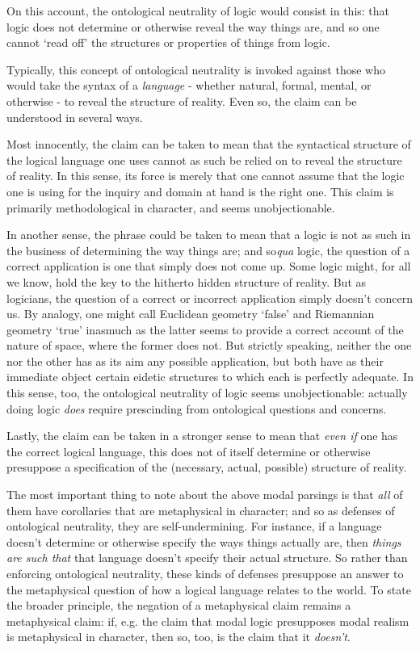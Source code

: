 \documentclass[]{article}
\begin{document}
On this account, the ontological neutrality of logic would consist in this: that logic does not determine or otherwise reveal the way things are, and so one cannot `read off' the structures or properties of things from logic.

Typically, this concept of ontological neutrality is invoked against those who would take the syntax of a \textit{language} - whether natural, formal, mental, or otherwise - to reveal the structure of reality. Even so, the claim can be understood in several ways. 

Most innocently, the claim can be taken to mean that the syntactical structure of the logical language one uses cannot as such be relied on to reveal the structure of reality. In this sense, its force is merely that one cannot assume that the logic one is using for the inquiry and domain at hand is the right one. This claim is primarily methodological in character, and seems unobjectionable.

In another sense, the phrase could be taken to mean that a logic is not as such in the business of determining the way things are; and so\textit{qua} logic, the question of a correct application is one that simply does not come up. Some logic might, for all we know, hold the key to the hitherto hidden structure of reality. But as logicians, the question of a correct or incorrect application simply doesn't concern us. By analogy, one might call Euclidean geometry `false' and Riemannian geometry `true' inasmuch as the latter seems to provide a correct account of the nature of space, where the former does not. But strictly speaking, neither the one nor the other has as its aim any possible application, but both have as their immediate object certain eidetic structures to which each is perfectly adequate. In this sense, too, the ontological neutrality of logic seems unobjectionable: actually doing logic \textit{does} require prescinding from ontological questions and concerns.

Lastly, the claim can be taken in a stronger sense to mean that \textit{even if} one has the correct logical language, this does not of itself determine or otherwise presuppose a specification of the (necessary, actual, possible) structure of reality.

The most important thing to note about the above modal parsings is that \textit{all} of them have corollaries that are metaphysical in character; and so as defenses of ontological neutrality, they are self-undermining. For instance, if a language doesn't determine or otherwise specify the ways things actually are, then \textit{things are such that} that language doesn't specify their actual structure. So rather than enforcing ontological neutrality, these kinds of defenses presuppose an answer to the metaphysical question of how a logical language relates to the world. To state the broader principle, the negation of a metaphysical claim remains a metaphysical claim: if, e.g. the claim that modal logic presupposes modal realism is metaphysical in character, then so, too, is the claim that it \textit{doesn't}.
\end{document}
